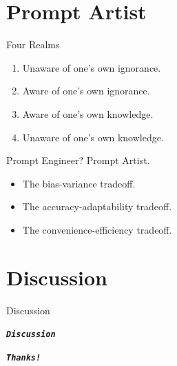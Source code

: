 \documentclass[UTF8, 16pt]{beamer}
\begin{document}
\begin{CJK*}{UTF8}{gbsn}
\section{Prompt Artist}
\begin{frame}{Four Realms}
	\begin{enumerate}
		\item Unaware of one's own ignorance.
		\item Aware of one's own ignorance.
		\item Aware of one's own knowledge.
		\item Unaware of one's own knowledge.
	\end{enumerate}
\end{frame}
\begin{frame}{Prompt Engineer? Prompt Artist.}
	\begin{itemize}
		\item The bias-variance tradeoff.
		\item The accuracy-adaptability tradeoff.
		\item The convenience-efficiency tradeoff.
	\end{itemize}
\end{frame}

\section{Discussion}
\begin{frame}{Discussion}
	\begin{center}
		\Huge\textbf{\textit{\texttt{Discussion}}}
	\end{center}
\end{frame}

\begin{frame}[allowframebreaks]%
	\begin{center}
		\Huge\textbf{\textit{\texttt{Thanks!}}}
	\end{center}
\end{frame}




\end{CJK*}
\end{document}
